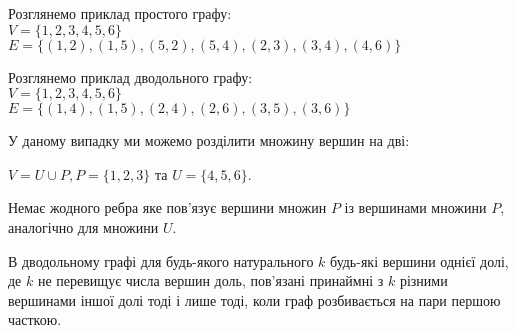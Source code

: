 \begin{example}
Розглянемо приклад простого графу: \\ $ V = \{1,2,3,4,5,6\}$ \\ $ E = \{ (1,2), (1,5), (5,2), (5,4), (2,3), (3,4), (4,6) \} $

\begin{center}
\end{center}
\end{example}

\begin{example}
Розглянемо приклад дводольного графу: \\ $ V = \{1,2,3,4,5,6\}$ \\ $ E = \{ (1,4), (1,5), (2,4), (2,6), (3,5), (3,6) \} $

\begin{center}
\end{center}
У даному випадку ми можемо розділити множину вершин на дві:
\begin{center}
$V = U \cup P, P = \{1,2,3\}$ та $U = \{4,5,6\}$.
\end{center}
Немає жодного ребра яке пов'язує вершини множин $P$ із вершинами множини $P$, аналогічно для множини $U$.
\end{example}

\begin{theorem}
В дводольному графі для будь-якого натурального $k$ будь-які вершини однієї долі, де $k$ не перевищує числа вершин доль, пов'язані принаймні з $k$ різними вершинами іншої долі тоді і лише тоді, коли граф розбивається на пари першою часткою.
\end{theorem}

